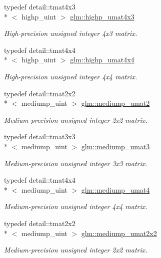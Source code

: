 \begin{DoxyCompactItemize}
typedef detail\-::tmat4x3\\*
$<$ highp\-\_\-uint $>$ \hyperlink{group__gtc__matrix__integer_ga6de5237bcae8a908a095d97d3ca74bdd}{glm\-::highp\-\_\-umat4x3}
\begin{DoxyCompactList}\small\item\em High-\/precision unsigned integer 4x3 matrix. \end{DoxyCompactList}\item 
typedef detail\-::tmat4x4\\*
$<$ highp\-\_\-uint $>$ \hyperlink{group__gtc__matrix__integer_ga8600f9e6e566b3dee70de37dafd2bd8c}{glm\-::highp\-\_\-umat4x4}
\begin{DoxyCompactList}\small\item\em High-\/precision unsigned integer 4x4 matrix. \end{DoxyCompactList}\item 
typedef detail\-::tmat2x2\\*
$<$ mediump\-\_\-uint $>$ \hyperlink{group__gtc__matrix__integer_gaba421c81f872757146b0adb7a954e349}{glm\-::mediump\-\_\-umat2}
\begin{DoxyCompactList}\small\item\em Medium-\/precision unsigned integer 2x2 matrix. \end{DoxyCompactList}\item 
typedef detail\-::tmat3x3\\*
$<$ mediump\-\_\-uint $>$ \hyperlink{group__gtc__matrix__integer_ga126ed770ed9106de1441a5a788e6485d}{glm\-::mediump\-\_\-umat3}
\begin{DoxyCompactList}\small\item\em Medium-\/precision unsigned integer 3x3 matrix. \end{DoxyCompactList}\item 
typedef detail\-::tmat4x4\\*
$<$ mediump\-\_\-uint $>$ \hyperlink{group__gtc__matrix__integer_ga41f8522ec6855007e5221193b58b156b}{glm\-::mediump\-\_\-umat4}
\begin{DoxyCompactList}\small\item\em Medium-\/precision unsigned integer 4x4 matrix. \end{DoxyCompactList}\item 
typedef detail\-::tmat2x2\\*
$<$ mediump\-\_\-uint $>$ \hyperlink{group__gtc__matrix__integer_gad7b4dd36037f24c8c2d7cac7e8ecb729}{glm\-::mediump\-\_\-umat2x2}
\begin{DoxyCompactList}\small\item\em Medium-\/precision unsigned integer 2x2 matrix. \end{DoxyCompactList}\item 

\end{DoxyCompactItemize}
